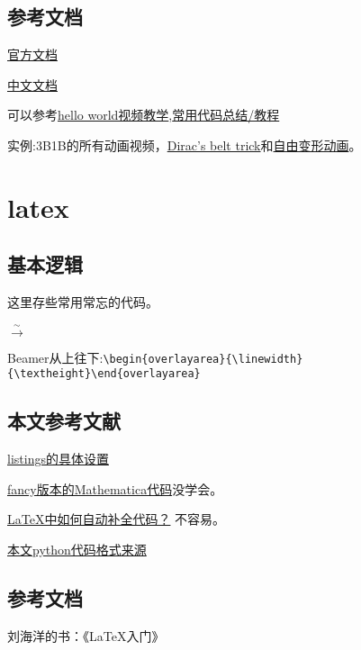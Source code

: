 \documentclass[11pt]{amsart}
\begin{document}
\subsection{参考文档}
\href{https://3b1b.github.io/manim/}{官方文档}

\href{https://docs.manim.org.cn/}{中文文档}

可以参考\href{https://www.bilibili.com/video/BV1KD4y1D7xD}{hello world视频教学},\href{https://www.bilibili.com/video/BV1p54y197cC}{常用代码总结/教程} 

实例:3B1B的所有动画视频，\href{https://www.youtube.com/watch?v=ACZC_XEyg9U&list=PLnQX-jgAF5pTkwtUuVpqS5tuWmJ-6ZM-Z&index=10}{Dirac's belt trick}和\href{https://www.bilibili.com/video/BV1sK4y1V7TE}{自由变形动画}。

\section{latex} 
\subsection{基本逻辑}
这里存些常用常忘的代码。

$\stackrel{\sim}{\longrightarrow}$


Beamer从上往下:\lstinline|\begin{overlayarea}{\linewidth}{\textheight}\end{overlayarea}|



\subsection{本文参考文献}

 \href{http://blog.sina.com.cn/s/blog_a382a9080102z25i.html}{listings的具体设置}
  
   \href{https://tex.stackexchange.com/questions/84748/fanciest-way-to-include-mathematica-code-in-latex}{fancy版本的Mathematica代码}没学会。
           
\href{https://tex.stackexchange.com/questions/126241/autoindent-in-texmaker}{\LaTeX 中如何自动补全代码？} 不容易。

\href{https://tex.stackexchange.com/questions/235783/listings-recognize-numbers-and-1e-3}{本文python代码格式来源}

\subsection{参考文档}
刘海洋的书：《\LaTeX 入门》
\end{document}
